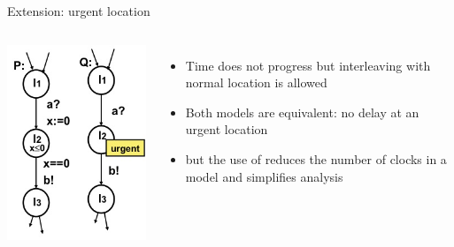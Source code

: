 \documentclass[aspectratio=169]{beamer}
\begin{document}
\begin{slide}{Extension: urgent location}
\small

\begin{columns}
     \includegraphics[width=\textwidth]{./images/urgent2.jpg} 

    \begin{itemize}
    \item Time does not progress but interleaving with normal location is allowed
    \item Both models are equivalent: \alert{no delay at an urgent location}
    \item but the use of  reduces the number of clocks in a model and simplifies analysis
    \end{itemize}
\end{columns}

\end{slide}
\end{document}
